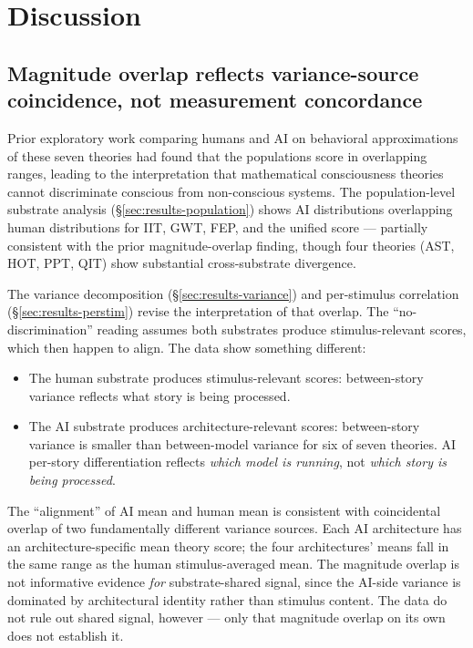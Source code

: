 \documentclass[11pt,a4paper]{article}
\begin{document}
\section{Discussion}

\subsection{Magnitude overlap reflects variance-source coincidence, not measurement concordance}

Prior exploratory work comparing humans and AI on behavioral approximations of these seven theories had found that the populations score in overlapping ranges, leading to the interpretation that mathematical consciousness theories cannot discriminate conscious from non-conscious systems. The population-level substrate analysis (\S\ref{sec:results-population}) shows AI distributions overlapping human distributions for IIT, GWT, FEP, and the unified score --- partially consistent with the prior magnitude-overlap finding, though four theories (AST, HOT, PPT, QIT) show substantial cross-substrate divergence.

The variance decomposition (\S\ref{sec:results-variance}) and per-stimulus correlation (\S\ref{sec:results-perstim}) revise the interpretation of that overlap. The ``no-discrimination'' reading assumes both substrates produce stimulus-relevant scores, which then happen to align. The data show something different:

\begin{itemize}
  \item The human substrate produces stimulus-relevant scores: between-story variance reflects what story is being processed.
  \item The AI substrate produces architecture-relevant scores: between-story variance is smaller than between-model variance for six of seven theories. AI per-story differentiation reflects \emph{which model is running}, not \emph{which story is being processed}.
\end{itemize}

The ``alignment'' of AI mean and human mean is consistent with coincidental overlap of two fundamentally different variance sources. Each AI architecture has an architecture-specific mean theory score; the four architectures' means fall in the same range as the human stimulus-averaged mean. The magnitude overlap is not informative evidence \emph{for} substrate-shared signal, since the AI-side variance is dominated by architectural identity rather than stimulus content. The data do not rule out shared signal, however --- only that magnitude overlap on its own does not establish it.
\end{document}
